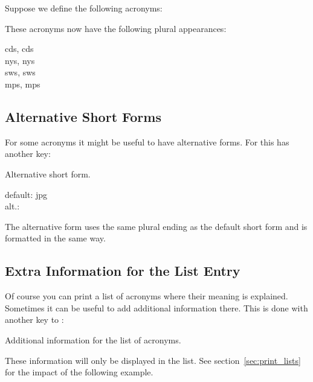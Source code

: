 \documentclass[load-preamble+,scrartcl={DIV10}]{cnltx-doc}
\begin{document}
Suppose we define the following acronyms:
\begin{sourcecode}
\end{sourcecode}
These acronyms now have the following plural appearances:
\begin{example}
  \acsp{cd}, \aclp{cd} \\
  \acsp{ny}, \aclp{ny} \\
  \acsp{sw}, \aclp{sw} \\
  \acsp{mp}, \aclp{mp}
\end{example}

\subsection{Alternative Short Forms}
For some acronyms it might be useful to have alternative forms.  For this
 has another key:
\begin{options}
   Alternative short form.
\end{options}
\begin{example}
  default: \acs{jpg} \\
  alt.: 
\end{example}
The alternative form uses the same plural ending as the default short form and
is formatted in the same way.

\subsection{Extra Information for the List Entry}
Of course you can print a list of acronyms where their meaning is explained.
Sometimes it can be useful to add additional information there.  This is done
with another key to :
\begin{options}
    Additional information for the list of acronyms.
\end{options}
These information will only be displayed in the list.  See
section~\ref{sec:print_lists} for the impact of the following example.
\end{document}
